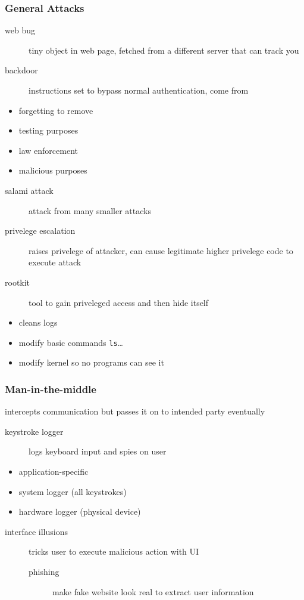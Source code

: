 \documentclass[]{article}
\theoremstyle{definition}
\begin{document}
	\subsubsection{General Attacks}
	\begin{description}
		\item[web bug] tiny object in web page, fetched from a different server that can track you
		\item[backdoor] instructions set to bypass normal authentication, come from
	\end{description}
	\begin{itemize}
		\item forgetting to remove
		\item testing purposes
		\item law enforcement
		\item malicious purposes
	\end{itemize}
	\begin{description}
		\item[salami attack] attack from many smaller attacks
		\item[privelege escalation] raises privelege of attacker, can cause legitimate higher privelege code to execute attack
		\item[rootkit] tool to gain priveleged access and then hide itself
	\end{description}
	\begin{itemize}
		\item cleans logs
		\item modify basic commands \lstinline|ls|\dots
		\item modify kernel so no programs can see it
	\end{itemize}

	\subsubsection{Man-in-the-middle}
	intercepts communication but passes it on to intended party eventually
	\begin{description}
		\item[keystroke logger] logs keyboard input and spies on user
	\end{description}
	\begin{itemize}
		\item application-specific
		\item system logger (all keystrokes)
		\item hardware logger (physical device)
	\end{itemize}
	\begin{description}
		\item[interface illusions] tricks user to execute malicious action with UI
			\begin{description}
				\item[phishing] make fake website look real to extract user information
			\end{description}
	\end{description}
\end{document}
